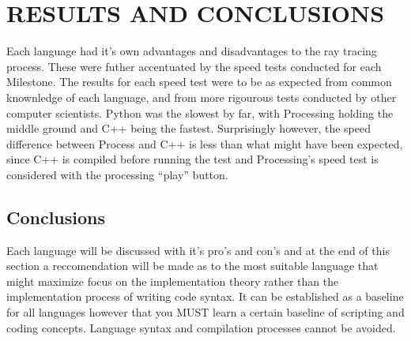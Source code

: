 %
%
%



\chapter{\uppercase{Results and Conclusions}}

Each language had it's own advantages and disadvantages to the ray tracing process.  These were futher accentuated by the speed tests conducted for each Milestone.  The results for each speed test were to be as expected from common knownledge of each language, and from more rigourous tests conducted by other computer scientists.  Python was the slowest by far, with Processing holding the middle ground and C++ being the fastest.  Surprisingly however, the speed difference between Process and C++ is less than what might have been expected, since C++ is compiled before running the test and Processing's speed test is considered with the processing ``play'' button.  

\section{Conclusions}
Each language will be discussed with it's pro's and con's and at the end of this section a reccomendation will be made as to the most suitable language that might maximize focus on the implementation theory rather than the implementation process of writing code syntax.  It can be established as a baseline for all languages however that you MUST learn a certain baseline of scripting and coding concepts. Language syntax and compilation processes cannot be avoided.  

